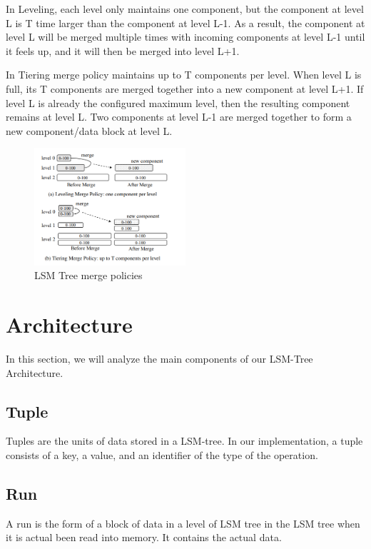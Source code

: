 \documentclass[sigconf]{acmart}
\begin{document}
    In Leveling, each level only maintains one component, but the component at level L is T time larger than the component at level L-1. As a result, the component at level L will be merged multiple times with incoming components at level L-1 until it feels up, and it will then be merged into level L+1.

    In Tiering merge policy maintains up to T components per level. When level L is full, its T components are merged together into a new component at level L+1. If level L is already the configured maximum level, then the resulting component remains at level L. Two components at level L-1 are merged together to form a new component/data block at level L.\\
    \begin{figure}[H]
        \centering
        \includegraphics[width=0.5\textwidth]{Images/MergingStrategies.PNG}
        \caption{LSM Tree merge policies}
        \label{Fig.main2}
    \end{figure}
    \section{Architecture}
    In this section, we will analyze the main components of our LSM-Tree Architecture.
    \subsection{Tuple}
    Tuples are the units of data stored in a LSM-tree. In our implementation, a tuple consists of a key, a value, and an identifier of the type of the operation.

    \subsection{Run}
    A run is the form of a block of data in a level of LSM tree in the LSM tree when it is actual been read into memory. It contains the actual data.
\end{document}
